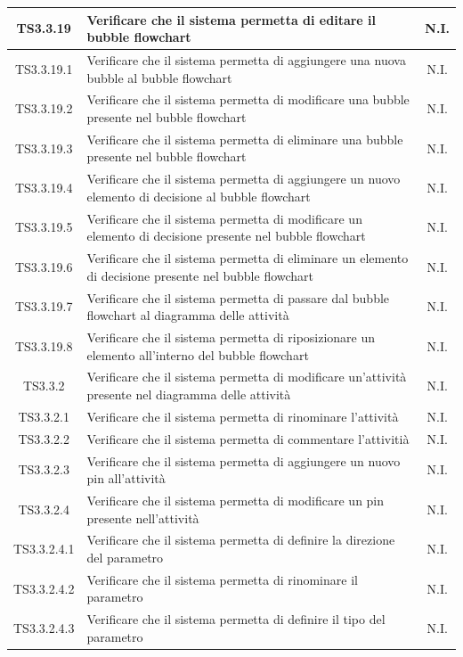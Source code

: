 \documentclass[../PianoDiQualifica.tex]{subfiles}
\begin{document}
\begin{longtable}{|c|>{\centering}p{10cm}|c|}
	\hline
	TS3.3.19 & Verificare che il sistema permetta di editare il bubble flowchart & N.I. \\
	\hline
	TS3.3.19.1 & Verificare che il sistema permetta di aggiungere una nuova bubble al bubble flowchart & N.I. \\
	\hline
	TS3.3.19.2 & Verificare che il sistema permetta di modificare una bubble presente nel bubble flowchart & N.I. \\
	\hline
	TS3.3.19.3 & Verificare che il sistema permetta di eliminare una bubble presente nel bubble flowchart & N.I. \\
	\hline
	TS3.3.19.4 & Verificare che il sistema permetta di aggiungere un nuovo elemento di decisione al bubble flowchart & N.I. \\
	\hline
	TS3.3.19.5 & Verificare che il sistema permetta di modificare un elemento di decisione presente nel bubble flowchart & N.I. \\
	\hline
	TS3.3.19.6 & Verificare che il sistema permetta di eliminare un elemento di decisione presente nel bubble flowchart & N.I. \\
	\hline
	TS3.3.19.7 & Verificare che il sistema permetta di passare dal bubble flowchart al diagramma delle attività & N.I. \\
	\hline
	TS3.3.19.8 & Verificare che il sistema permetta di riposizionare un elemento all'interno del bubble flowchart & N.I. \\
	\hline
	TS3.3.2 & Verificare che il sistema permetta di modificare un'attività presente nel diagramma delle attività & N.I. \\
	\hline
	TS3.3.2.1 & Verificare che il sistema permetta di rinominare l'attività & N.I. \\
	\hline
	TS3.3.2.2 & Verificare che il sistema permetta di commentare l'attivitià & N.I. \\
	\hline
	TS3.3.2.3 & Verificare che il sistema permetta di aggiungere un nuovo pin all'attività & N.I. \\
	\hline
	TS3.3.2.4 & Verificare che il sistema permetta di modificare un pin presente nell'attività & N.I. \\
	\hline
	TS3.3.2.4.1 & Verificare che il sistema permetta di definire la direzione del parametro & N.I. \\
	\hline
	TS3.3.2.4.2 & Verificare che il sistema permetta di rinominare il parametro & N.I. \\
	\hline
	TS3.3.2.4.3 & Verificare che il sistema permetta di definire il tipo del parametro & N.I. \\

\end{longtable}
\end{document}
